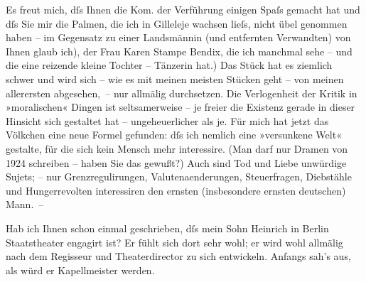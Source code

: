 \pstart
           Es freut mich, dſs Ihnen die Kom. der Verführung
               einigen Spaſs gemacht hat und dſs Sie mir die Palmen, die ich in Gilleleje wachsen {\pb}lieſs,
               nicht übel genommen haben – \label{T_L02423-1v}\label{T_L02423-1}im
               Gegensatz zu einer Landsmännin (und entfernten Verwandten) von Ihnen glaub ich), der
               Frau Karen Stampe Bendix, die ich manchmal sehe
               – und die eine reizende kleine Tochter – Tänzerin hat.) Das Stück hat es ziemlich schwer und wird sich – wie es mit
               meinen meisten Stücken geht – von meinen allerersten abgesehen, – nur allmälig
               durchsetzen. Die Verlogenheit der Kritik in »moralischen« Dingen ist seltsamerweise –
               je freier die Existenz gerade in dieser Hinsicht sich gestaltet hat – ungeheuerlicher
               als je. Für mich hat jetzt das Völkchen eine neue Formel gefunden: dſs ich nemlich
               eine »versunkene Welt« gestalte, für die sich kein Mensch mehr interessire. (Man darf
               nur Dramen von 1924 schreiben – haben Sie das gewußt?) Auch sind Tod und
               Liebe unwürdige Sujets; – nur Grenzregulirungen, Valutenaenderungen, Steuerfragen,
               Diebstähle und Hungerrevolten interessiren den {\pb}ernsten (insbesondere ernsten deutschen) Mann. –\pend
           
\pstart
           Hab ich Ihnen schon einmal geschrieben, dſs mein Sohn Heinrich in Berlin
                  Staatstheater engagirt ist? Er fühlt sich dort sehr wohl; er wird wohl
               allmälig nach dem Regisseur und Theaterdirector zu sich entwickeln. Anfangs sah's
               aus, als würd er Kapellmeister werden.\pend
           
